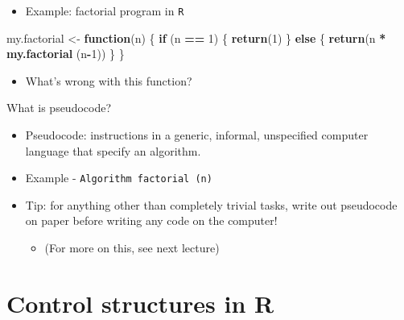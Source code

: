 \documentclass[ignorenonframetext,]{beamer}
\newenvironment{Shaded}{\begin{snugshade}}{\end{snugshade}}
\newcommand{\KeywordTok}[1]{\textcolor[rgb]{0.13,0.29,0.53}{\textbf{#1}}}
\newcommand{\DecValTok}[1]{\textcolor[rgb]{0.00,0.00,0.81}{#1}}
\newcommand{\StringTok}[1]{\textcolor[rgb]{0.31,0.60,0.02}{#1}}
\newcommand{\ControlFlowTok}[1]{\textcolor[rgb]{0.13,0.29,0.53}{\textbf{#1}}}
\newcommand{\OperatorTok}[1]{\textcolor[rgb]{0.81,0.36,0.00}{\textbf{#1}}}
\newcommand{\NormalTok}[1]{#1}
\providecommand{\tightlist}{%
  \setlength{\itemsep}{0pt}\setlength{\parskip}{0pt}}
\begin{document}
\begin{frame}[fragile]

\begin{itemize}[<+->]
\tightlist
\item
  Example: factorial program in \texttt{R}
\end{itemize}

\begin{Shaded}
\begin{Highlighting}[]
\NormalTok{my.factorial <-}\StringTok{ }\ControlFlowTok{function}\NormalTok{(n) \{}
  \ControlFlowTok{if}\NormalTok{ (n }\OperatorTok{==}\StringTok{ }\DecValTok{1}\NormalTok{) \{}
    \KeywordTok{return}\NormalTok{(}\DecValTok{1}\NormalTok{)}
\NormalTok{  \} }\ControlFlowTok{else}\NormalTok{ \{}
    \KeywordTok{return}\NormalTok{(n }\OperatorTok{*}\StringTok{ }\KeywordTok{my.factorial}\NormalTok{ (n}\OperatorTok{-}\DecValTok{1}\NormalTok{))}
\NormalTok{  \}}
\NormalTok{\}}
\end{Highlighting}
\end{Shaded}

\begin{itemize}[<+->]
\tightlist
\item
  What's wrong with this function?
\end{itemize}

\end{frame}

\begin{frame}[fragile]{What is pseudocode?}

\begin{itemize}[<+->]
\item
  Pseudocode: instructions in a generic, informal, unspecified computer
  language that specify an algorithm.
\item
  Example - \texttt{Algorithm\ factorial\ (n)}
\item
  Tip: for anything other than completely trivial tasks, write out
  pseudocode on paper before writing any code on the computer!

  \begin{itemize}[<+->]
  \tightlist
  \item
    (For more on this, see next lecture)
  \end{itemize}
\end{itemize}

\end{frame}

\section{Control structures in R}\label{control-structures-in-r}
\end{document}
